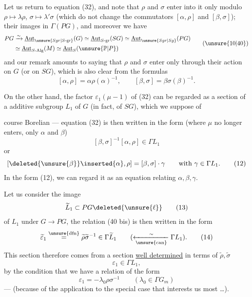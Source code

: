 Let us return to equation (32), and note that $\rho$ and $\sigma$ enter into it only modulo  $\rho\mapsto\lambda\rho$, $\sigma\mapsto\lambda'\sigma$  (which do not change the commutators $[\alpha,\rho]$ and $[\beta,\sigma]$);    their images in $\Gamma(PG)$, and moreover we have
\[
\begin{aligned}
PG&\xrightarrow{\sim}\underline{\mathrm{Aut}}_{\unsure{Sgr|S\text{-gr}}}(G)
\simeq\underline{\mathrm{Aut}}_{S\text{-gr}}(SG)
\simeq\underline{\mathrm{Aut}}_{\unsure{Sgr|Sg}}(PG)\\
&\simeq\underline{\mathrm{Aut}}_{S\text{-Alg}}(M)
\simeq\underline{\mathrm{Aut}}_S(\unsure{\mathbb P|P})
\end{aligned} \tag{\unsure{10|40}}
\]
and our remark amounts to saying that $\rho$ and $\sigma$ enter only through their action on $G$ (or on $SG$), which is also clear from the formulas
\[
[\alpha,\rho]=\alpha\rho(\alpha)^{-1},\qquad
[\beta,\sigma]=\beta\sigma(\beta)^{-1}.
\]

On the other hand, the factor $\varepsilon_1(\mu-1)$ of (32) can be regarded as a section of a  additive subgroup $L_1$ of $G$ (in fact, of $SG$), which we suppose of


course Borelian --- equation (32) is then written in the form (where $\mu$ no longer enters, only $\alpha$ and $\beta$)
\[
[\beta,\sigma]^{-1}[\alpha,\rho]\in\Gamma L_1 \tag{11}
\]
or
\[
[\deleted{\unsure{\beta}}\inserted{\alpha},\rho]=[\beta,\sigma]\cdot\gamma
\qquad\text{with }\gamma\in\Gamma L_1. \tag{12}
\]
In the form (12), we can regard it as an equation relating $\alpha,\beta,\gamma$.

Let us consider the image 
\[
\widetilde L_1\subset PG\deleted{\unsure{\ell}} \tag{13}
\]
of $L_1$ under $G\longrightarrow PG$, the relation (40 bis) is then written in the form
\[
\widetilde\varepsilon_1\overset{\unsure{\mathrm{dfn}}}{=}
\widetilde\rho\widetilde\sigma^{-1}\in\Gamma\widetilde L_1
\qquad(\xleftarrow[\unsure{\mathrm{can}}]{\sim}\Gamma L_1). \tag{14}
\]
This section therefore comes from a section \uline{well determined}  in terms of $\widetilde\rho,\widetilde\sigma$
\[
\varepsilon_1\in\Gamma L_1, \tag{15}
\]
 by the condition that we have a relation of the form
\[
\varepsilon_1=-\lambda_0\rho\sigma^{-1}
\qquad(\lambda_0\in\Gamma G_m) \tag*{(16) = (40 bis)}
\]
 --- (because of the application to the special case that interests us most \ldots).

